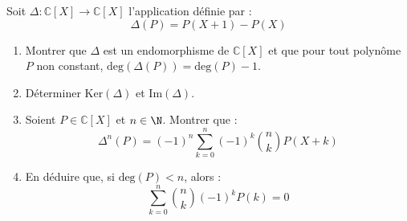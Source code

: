 \documentclass[a4paper,10pt]{report}
\begin{document}
\begin{Exa} Soit $\Delta : \mathbb{C}[X] \rightarrow \mathbb{C}[X]$ l'application définie par :
  \[
  \Delta (P ) = P( X + 1 ) - P(X )
  \]
  \begin{enumerate}
  \item
    Montrer que $\Delta$ est un endomorphisme de $\mathbb{C}[X]$ et que pour tout polynôme $P$ non constant, $\textrm{deg} ( \Delta(P)) = \textrm{deg}(P) - 1$.
  \item
    Déterminer $\textrm{Ker}(\Delta)$ et $\textrm{Im}(\Delta)$.
  \item Soient $P \in \mathbb{C}[X]$ et $n \in \N$. Montrer que :
    \[
    \Delta^{n}(P) = ( - 1)^{n} \sum_{k = 0}^{n} ( - 1)^{k} \binom{n}{k}P(X + k)
    \]
  \item En déduire que, si $\textrm{deg}(P) < n$, alors :
    \[
    \sum_{k = 0}^{n} \binom{n}{k}( - 1)^{k} P(k) = 0 
    \]
  \end{enumerate}
\end{Exa} 

\corr 
\end{document}
